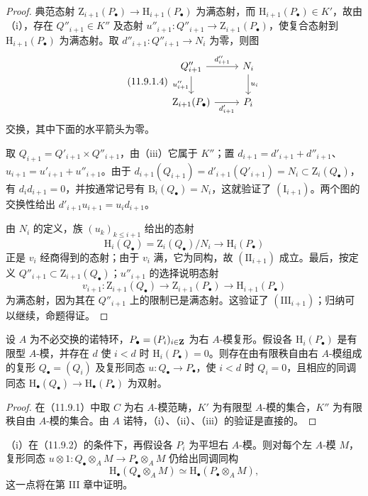 \begin{proof}
典范态射 $\mathrm Z_{i+1}(P_\bullet)\to\mathrm H_{i+1}(P_\bullet)$ 为满态射，而 $\mathrm H_{i+1}(P_\bullet)\in K'$，故由（i），存在 $Q''_{i+1}\in K''$ 及态射 $u''_{i+1}:Q''_{i+1}\to\mathrm Z_{i+1}(P_\bullet)$，使复合态射到 $\mathrm H_{i+1}(P_\bullet)$ 为满态射。取 $d''_{i+1}:Q''_{i+1}\to N_i$ 为零，则图
\begin{equation}\tag{11.9.1.4}
\begin{tikzcd}
Q''_{i+1}\arrow[r,"d''_{i+1}"]\arrow[d,"u''_{i+1}"']&N_i\arrow[d,"u_i"]\\
\mathrm Z_{i+1}(P_\bullet)\arrow[r,"d'_{i+1}"']&P_i
\end{tikzcd}
\end{equation}
交换，其中下面的水平箭头为零。

取 $Q_{i+1}=Q'_{i+1}\times Q''_{i+1}$，由（iii）它属于 $K''$；置 $d_{i+1}=d'_{i+1}+d''_{i+1}$、$u_{i+1}=u'_{i+1}+u''_{i+1}$。由于 $d_{i+1}(Q_{i+1})=d'_{i+1}(Q'_{i+1})=N_i\subset\mathrm Z_i(Q_\bullet)$，有 $d_id_{i+1}=0$，并按通常记号有 $\mathrm B_i(Q_\bullet)=N_i$，这就验证了 $(\mathrm I_{i+1})$。两个图的交换性给出 $d'_{i+1}u_{i+1}=u_id_{i+1}$。

由 $N_i$ 的定义，族 $(u_k)_{k\leq i+1}$ 给出的态射
\[
\mathrm H_i(Q_\bullet)=\mathrm Z_i(Q_\bullet)/N_i\longrightarrow\mathrm H_i(P_\bullet)
\]
正是 $v_i$ 经商得到的态射；由于 $v_i$ 满，它为同构，故 $(\mathrm{II}_{i+1})$ 成立。最后，按定义 $Q''_{i+1}\subset\mathrm Z_{i+1}(Q_\bullet)$；$u''_{i+1}$ 的选择说明态射
\[
v_{i+1}:\mathrm Z_{i+1}(Q_\bullet)\to\mathrm Z_{i+1}(P_\bullet)\to\mathrm H_{i+1}(P_\bullet)
\]
为满态射，因为其在 $Q''_{i+1}$ 上的限制已是满态射。这验证了 $(\mathrm{III}_{i+1})$；归纳可以继续，命题得证。
\end{proof}

设 $A$ 为不必交换的诺特环，$P_\bullet=(P_i)_{i\in\mathbf Z}$ 为右 $A$-模复形。假设各 $\mathrm H_i(P_\bullet)$ 是有限型 $A$-模，并存在 $d$ 使 $i<d$ 时 $\mathrm H_i(P_\bullet)=0$。则存在由有限秩自由右 $A$-模组成的复形 $Q_\bullet=(Q_i)$ 及复形同态 $u:Q_\bullet\to P_\bullet$，使 $i<d$ 时 $Q_i=0$，且相应的同调同态 $\mathrm H_\bullet(Q_\bullet)\to\mathrm H_\bullet(P_\bullet)$ 为双射。
\begin{proof}
在（11.9.1）中取 $C$ 为右 $A$-模范畴，$K'$ 为有限型 $A$-模的集合，$K''$ 为有限秩自由 $A$-模的集合。由 $A$ 诺特，（i）、（ii）、（iii）的验证是直接的。
\end{proof}

（i）在（11.9.2）的条件下，再假设各 $P_i$ 为平坦右 $A$-模。则对每个左 $A$-模 $M$，复形同态 $u\otimes1:Q_\bullet\otimes_A M\to P_\bullet\otimes_A M$ 仍给出同调同构
\[
\mathrm H_\bullet(Q_\bullet\otimes_A M)\simeq\mathrm H_\bullet(P_\bullet\otimes_A M),
\]
这一点将在第 III 章中证明。

